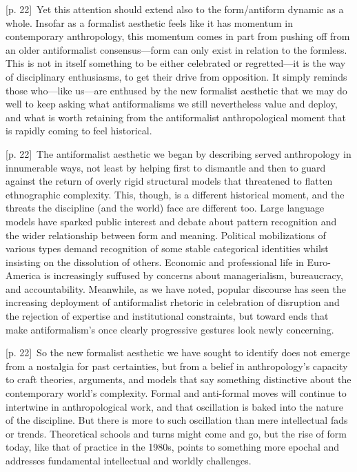 \documentclass[10pt,a4paper]{article}
\begin{document}
{\scriptsize\color{gray} [p. 22]}\ Yet this attention should extend also to the form/antiform dynamic as a whole. Insofar as a formalist aesthetic feels like it has momentum in contemporary anthropology, this momentum comes in part from pushing off from an older antiformalist consensus—form can only exist in relation to the formless. This is not in itself something to be either celebrated or regretted—it is the way of disciplinary enthusiasms, to get their drive from opposition. It simply reminds those who—like us—are enthused by the new formalist aesthetic that we may do well to keep asking what antiformalisms we still nevertheless value and deploy, and what is worth retaining from the antiformalist anthropological moment that is rapidly coming to feel historical.\par
{\scriptsize\color{gray} [p. 22]}\ The antiformalist aesthetic we began by describing served anthropology in innumerable ways, not least by helping first to dismantle and then to guard against the return of overly rigid structural models that threatened to flatten ethnographic complexity. This, though, is a different historical moment, and the threats the discipline (and the world) face are different too. Large language models have sparked public interest and debate about pattern recognition and the wider relationship between form and meaning. Political mobilizations of various types demand recognition of some stable categorical identities whilst insisting on the dissolution of others. Economic and professional life in Euro-America is increasingly suffused by concerns about managerialism, bureaucracy, and accountability. Meanwhile, as we have noted, popular discourse has seen the increasing deployment of antiformalist rhetoric in celebration of disruption and the rejection of expertise and institutional constraints, but toward ends that make antiformalism’s once clearly progressive gestures look newly concerning.\par
{\scriptsize\color{gray} [p. 22]}\ So the new formalist aesthetic we have sought to identify does not emerge from a nostalgia for past certainties, but from a belief in anthropology’s capacity to craft theories, arguments, and models that say something distinctive about the contemporary world’s complexity. Formal and anti-formal moves will continue to intertwine in anthropological work, and that oscillation is baked into the nature of the discipline. But there is more to such oscillation than mere intellectual fads or trends. Theoretical schools and turns might come and go, but the rise of form today, like that of practice in the 1980s, points to something more epochal and addresses fundamental intellectual and worldly challenges.\par
\end{document}
